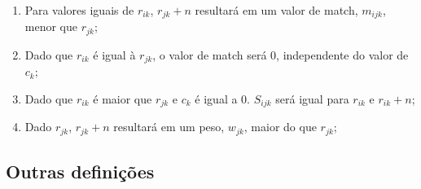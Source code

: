 \documentclass[preprint,12pt]{elsarticle}
\begin{document}
\begin{enumerate}
\item Para valores iguais de $r_{ik}$, $r_{jk} + n$ resultará em um valor de match, $m_{ijk}$, menor que $r_{jk}$;
\item Dado que $r_{ik}$ é igual à $r_{jk}$, o valor de match será $0$, independente do valor de $c_{k}$;
\item Dado que $r_{ik}$ é maior que $r_{jk}$ e $c_k$ é igual a 0. $S_{ijk}$ será igual para $r_{ik}$ e $r_{ik} + n$; 
\item Dado $r_{jk}$, $r_{jk} + n$ resultará em um peso, $w_{jk}$, maior do que $r_{jk}$; 

\end{enumerate}



    

\subsection{Outras definições}
\end{document}
